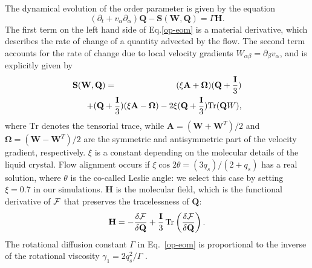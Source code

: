 \documentclass[aps,pre,reprint,superscriptaddress, twocolumn]{revtex4}
\begin{document}
The dynamical evolution of the order parameter is given by the equation 
\begin{equation}
\left(\partial_t+ v_\alpha \partial_\alpha \right){\mathbf Q} - {\mathbf S}({\mathbf W},{\mathbf Q}) = \Gamma {\mathbf H}.
\label{op-eom}
\end{equation}
The first term on the left hand side of Eq.\ref{op-eom} is a material derivative, which describes the rate of change of a quantity advected by the flow.
The second term accounts for the rate of change due to local velocity gradients $W_{\alpha \beta}=\partial_\beta v_\alpha$,
and is explicitly given by
\begin{eqnarray}
{\mathbf S}({\mathbf W}, {\mathbf Q}) &=& (\xi {\mathbf A} + {\boldsymbol \Omega})({\mathbf Q}+\frac{\mathbf I}{3})\nonumber\\
& &\hspace*{-1.5cm}+ ({\mathbf Q}+\frac{\mathbf I}{3})(\xi {\mathbf A}  - {\boldsymbol \Omega})-2 \xi ({\mathbf Q}+\frac{\mathbf I}{3})
\mathrm{Tr}({\mathbf Q W}),
\label{sw}
\end{eqnarray}
where $\mathrm{Tr}$ denotes the tensorial trace, while 
${\mathbf A}=({\mathbf W}+{\mathbf W}^T)/2$ and
${\boldsymbol \Omega}=({\mathbf W}-{\mathbf W}^T)/2$ are the symmetric and antisymmetric part of the velocity gradient, respectively. $\xi$ 
is a constant depending on the molecular details of the liquid crystal.
Flow alignment occurs if $\xi \cos{2\theta}=(3q_s)/(2+q_s)$ has a real solution, where $\theta$ is the 
co-called Leslie angle: we select this case by 
setting $\xi=0.7$ in our simulations.
${\mathbf H}$ is the molecular field, which is the functional derivative of $\cal F$ that preserves the tracelessness of $\mathbf Q$:
\begin{equation}
{\bf H}=-\frac{\delta {\cal F}}{\delta {\bf Q}}+\frac{\bf I}{3}\,
\mathrm{Tr} \left(\frac{\delta {\cal F}}{\delta {\bf Q}}\right).
\label{molfield}
\end{equation}
The rotational diffusion constant $\Gamma$ in Eq.~\ref{op-eom} is proportional
to the inverse of the rotational viscosity $\gamma_1=2 q_s^2/\Gamma$
\cite{deGennes}.
\end{document}

